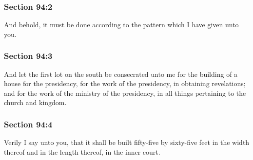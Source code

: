 	\subsubsection{Section 94:2} %
		\label{DC94-2}

		And behold, it must be done according to the pattern which I have given unto you.


	\subsubsection{Section 94:3} %
		\label{DC94-3}

		And let the first lot on the south be consecrated unto me for the building of a house for the presidency, for the work of the presidency, in obtaining revelations; and for the work of the ministry of the presidency, in all things pertaining to the church and kingdom.


	\subsubsection{Section 94:4} %
		\label{DC94-4}

		Verily I say unto you, that it shall be built fifty-five by sixty-five feet in the width thereof and in the length thereof, in the inner court.


